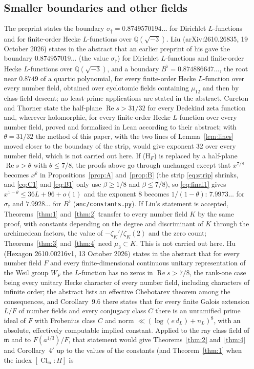 \documentclass[11pt]{article}
\theoremstyle{definition}
\theoremstyle{remark}
\numberwithin{equation}{section}
\newcommand{\Q}{\mathbb Q}
\newcommand{\fm}{\mathfrak m}
\newcommand{\Cl}{\operatorname{Cl}}
\newcommand{\Rea}{\operatorname{Re}}
\newcommand{\HF}{\textup{(H$_F$)}}
\begin{document}
\subsection{Smaller boundaries and other fields}\label{sec:other}
The preprint \cite{guo2026zf} states the boundary $\sigma_\dagger=0.8749570194\ldots$ for Dirichlet $L$-functions and for finite-order Hecke $L$-functions over $\Q(\sqrt{-3})$. Liu \cite{liu2026} (arXiv:2610.26835, 19 October 2026) states in the abstract that an earlier preprint of his gave the boundary $0.874957019\ldots$ (the value $\sigma_\dagger$) for Dirichlet $L$-functions and finite-order Hecke $L$-functions over $\Q(\sqrt{-3})$, and a boundary $B^\flat=0.874886647\ldots$, the root near $0.8749$ of a quartic polynomial, for every finite-order Hecke $L$-function over every number field, obtained over cyclotomic fields containing $\mu_{12}$ and then by class-field descent; no least-prime applications are stated in the abstract. Cureton and Thorner \cite{ct2026} state the half-plane $\Rea s>31/32$ for every Dedekind zeta function and, wherever holomorphic, for every finite-order Hecke $L$-function over every number field, proved and formalized in Lean according to their abstract; with $\theta=31/32$ the method of this paper, with the two lines of Lemma~\ref{lem:lines} moved closer to the boundary of the strip, would give exponent $32$ over every number field, which is not carried out here. If \HF{} is replaced by a half-plane $\Rea s>\theta$ with $\theta\le7/8$, the proofs above go through unchanged except that $x^{7/8}$ becomes $x^{\theta}$ in Propositions~\ref{prop:A} and~\ref{prop:B} (the strip \eqref{eq:strip} shrinks, and \eqref{eq:C1} and \eqref{eq:B1} only use $\beta\ge1/8$ and $\beta\le7/8$), so \eqref{eq:final1} gives $x^{1-\theta}\le36L+96+o(1)$ and the exponent $8$ becomes $1/(1-\theta)$: $7.9973\ldots$ for $\sigma_\dagger$ and $7.9928\ldots$ for $B^\flat$ (\texttt{anc/constants.py}). If Liu's statement is accepted, Theorems~\ref{thm:1} and~\ref{thm:2} transfer to every number field $K$ by the same proof, with constants depending on the degree and discriminant of $K$ through the archimedean factors, the value of $-\zeta_K'/\zeta_K(2)$ and the zero count; Theorems~\ref{thm:3} and~\ref{thm:4} need $\mu_3\subset K$. This is not carried out here. Hu \cite{hu2026} (Hexagon 2610.00216v1, 13 October 2026) states in the abstract that for every number field $F$ and every finite-dimensional continuous unitary representation of the Weil group $W_F$ the $L$-function has no zeros in $\Rea s>7/8$, the rank-one case being every unitary Hecke character of every number field, including characters of infinite order; the abstract lists an effective Chebotarev theorem among the consequences, and Corollary~9.6 there states that for every finite Galois extension $L/F$ of number fields and every conjugacy class $C$ there is an unramified prime ideal of $F$ with Frobenius class $C$ and norm $\ll(\log(e\,d_L)+n_L)^8$, with an absolute, effectively computable implied constant. Applied to the ray class field of $\fm$ and to $F(a^{1/3})/F$, that statement would give Theorems~\ref{thm:2} and~\ref{thm:4} and Corollary~4$'$ up to the values of the constants (and Theorem~\ref{thm:1} when the index $[\Cl_\fm:H]$ is 
\end{document}
